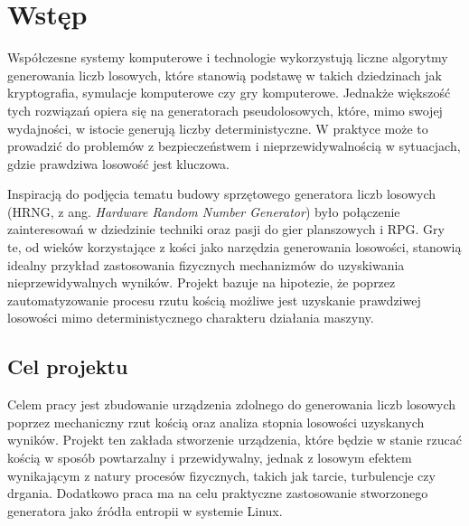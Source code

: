 \chapter{Wstęp}\label{ch:wstep}


Współczesne systemy komputerowe i technologie wykorzystują liczne algorytmy generowania liczb losowych, które stanowią podstawę w takich dziedzinach jak kryptografia,
symulacje komputerowe czy gry komputerowe.
Jednakże większość tych rozwiązań opiera się na generatorach pseudolosowych,
które, mimo swojej wydajności, w istocie generują liczby deterministyczne.
W praktyce może to prowadzić do problemów z bezpieczeństwem i nieprzewidywalnością w sytuacjach, gdzie prawdziwa losowość jest kluczowa.

Inspiracją do podjęcia tematu budowy sprzętowego generatora liczb losowych (HRNG, z ang. \textit{Hardware Random Number Generator})
było połączenie zainteresowań w dziedzinie techniki oraz pasji do gier planszowych i RPG. %
Gry te, od wieków korzystające z kości jako narzędzia generowania losowości, stanowią idealny przykład zastosowania fizycznych mechanizmów do uzyskiwania nieprzewidywalnych wyników.
Projekt bazuje na hipotezie, że poprzez zautomatyzowanie procesu rzutu kością możliwe jest uzyskanie prawdziwej losowości mimo deterministycznego charakteru działania maszyny.

\section{Cel projektu}\label{sec:cel-projektu}

Celem pracy jest zbudowanie urządzenia zdolnego do generowania liczb losowych poprzez mechaniczny rzut kością oraz analiza stopnia losowości uzyskanych wyników.
Projekt ten zakłada stworzenie urządzenia, które będzie w stanie rzucać kością w sposób powtarzalny i przewidywalny,
jednak z losowym efektem wynikającym z natury procesów fizycznych, takich jak tarcie, turbulencje czy drgania.
Dodatkowo praca ma na celu praktyczne zastosowanie stworzonego generatora jako źródła entropii w systemie Linux.

